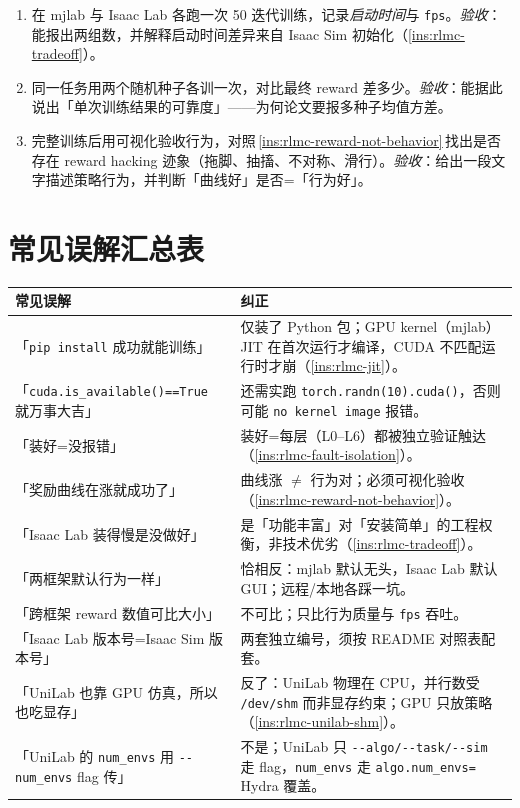 \begin{practice}[跨框架对比动手任务]
\begin{enumerate}
  \item 在 mjlab 与 Isaac Lab 各跑一次 50 迭代训练，记录\emph{启动时间}与 \verb|fps|。\emph{验收}：能报出两组数，并解释启动时间差异来自 Isaac Sim 初始化（\cref{ins:rlmc-tradeoff}）。
  \item 同一任务用两个随机种子各训一次，对比最终 reward 差多少。\emph{验收}：能据此说出「单次训练结果的可靠度」——为何论文要报多种子均值方差。
  \item 完整训练后用可视化验收行为，对照\,\cref{ins:rlmc-reward-not-behavior}\,找出是否存在 reward hacking 迹象（拖脚、抽搐、不对称、滑行）。\emph{验收}：给出一段文字描述策略行为，并判断「曲线好」是否=「行为好」。
\end{enumerate}
\end{practice}

\section{常见误解汇总表}
\label{sec:rlmc-setup-misconceptions}

\begin{center}
\small
\begin{tabular}{@{}p{5.2cm}p{8.0cm}@{}}
\toprule
常见误解 & 纠正 \\
\midrule
「\texttt{pip install} 成功就能训练」 & 仅装了 Python 包；GPU kernel（mjlab）JIT 在首次运行才编译，CUDA 不匹配运行时才崩（\cref{ins:rlmc-jit}）。 \\
「\texttt{cuda.\allowbreak is\_available()==True} 就万事大吉」 & 还需实跑 \texttt{torch.\allowbreak randn(10).\allowbreak cuda()}，否则可能 \texttt{no kernel image} 报错。 \\
「装好=没报错」 & 装好=每层（L0--L6）都被独立验证触达（\cref{ins:rlmc-fault-isolation}）。 \\
「奖励曲线在涨就成功了」 & 曲线涨 $\ne$ 行为对；必须可视化验收（\cref{ins:rlmc-reward-not-behavior}）。 \\
「Isaac Lab 装得慢是没做好」 & 是「功能丰富」对「安装简单」的工程权衡，非技术优劣（\cref{ins:rlmc-tradeoff}）。 \\
「两框架默认行为一样」 & 恰相反：mjlab 默认无头，Isaac Lab 默认 GUI；远程/本地各踩一坑。 \\
「跨框架 reward 数值可比大小」 & 不可比；只比行为质量与 \texttt{fps} 吞吐。 \\
「Isaac Lab 版本号=Isaac Sim 版本号」 & 两套独立编号，须按 README 对照表配套。 \\
「UniLab 也靠 GPU 仿真，所以也吃显存」 & 反了：UniLab 物理在 CPU，并行数受 \texttt{/dev/shm} 而非显存约束；GPU 只放策略（\cref{ins:rlmc-unilab-shm}）。 \\
「UniLab 的 \texttt{num\_envs} 用 \texttt{-{}-num\_envs} flag 传」 & 不是；UniLab 只 \texttt{-{}-algo/-{}-task/-{}-sim} 走 flag，\texttt{num\_envs} 走 \texttt{algo.\allowbreak num\_envs=} Hydra 覆盖。 \\
\bottomrule
\end{tabular}
\end{center}

